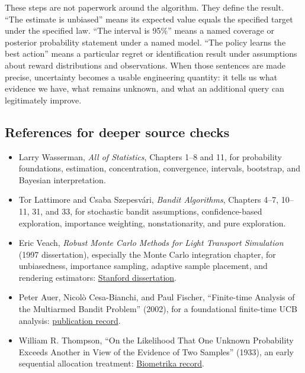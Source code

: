 These steps are not paperwork around the algorithm. They define the result. ``The estimate is unbiased'' means its expected value equals the specified target under the specified law. ``The interval is 95\%'' means a named coverage or posterior probability statement under a named model. ``The policy learns the best action'' means a particular regret or identification result under assumptions about reward distributions and observations. When those sentences are made precise, uncertainty becomes a usable engineering quantity: it tells us what evidence we have, what remains unknown, and what an additional query can legitimately improve.

\subsection{References for deeper source checks}\label{03-visual-computing-i-ch012-references-for-deeper-source-checks}

\begin{itemize}
\tightlist
\item
  Larry Wasserman, \emph{All of Statistics}, Chapters 1--8 and 11, for probability foundations, estimation, concentration, convergence, intervals, bootstrap, and Bayesian interpretation.
\item
  Tor Lattimore and Csaba Szepesvári, \emph{Bandit Algorithms}, Chapters 4--7, 10--11, 31, and 33, for stochastic bandit assumptions, confidence-based exploration, importance weighting, nonstationarity, and pure exploration.
\item
  Eric Veach, \emph{Robust Monte Carlo Methods for Light Transport Simulation} (1997 dissertation), especially the Monte Carlo integration chapter, for unbiasedness, importance sampling, adaptive sample placement, and rendering estimators: \href{https://graphics.stanford.edu/papers/veach_thesis/}{Stanford dissertation}.
\item
  Peter Auer, Nicolò Cesa-Bianchi, and Paul Fischer, ``Finite-time Analysis of the Multiarmed Bandit Problem'' (2002), for a foundational finite-time UCB analysis: \href{https://www2.compute.dtu.dk/pubdb/pubs/2088-full.html}{publication record}.
\item
  William R. Thompson, ``On the Likelihood That One Unknown Probability Exceeds Another in View of the Evidence of Two Samples'' (1933), an early sequential allocation treatment: \href{https://academic.oup.com/biomet/article-abstract/25/3-4/285/200862}{Biometrika record}.
\end{itemize}

